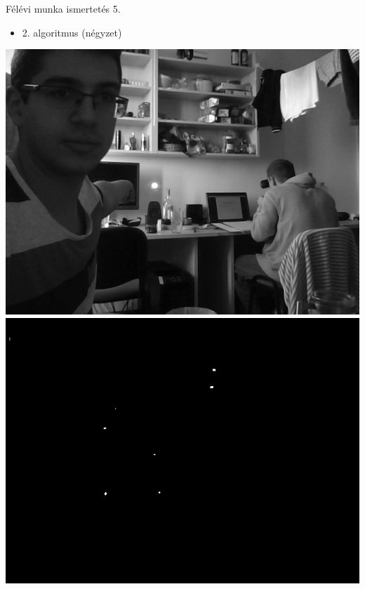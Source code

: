 \documentclass[17pt,xcolor=x11names]{beamer}
\begin{document}
\begin{frame}{Félévi munka ismertetés 5.}
\begin{itemize}
\item 2. algoritmus (négyzet)
\end{itemize}
\begin{center}
\includegraphics[scale=0.225]{figs/laser2-a.png}
\hspace{20pt}
\includegraphics[scale=0.225]{figs/laser2-b.png}
\end{center}
\end{frame}
\end{document}
